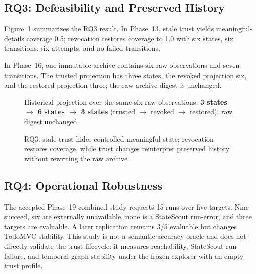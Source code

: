 \documentclass[conference]{IEEEtran}
\begin{document}
\subsection{RQ3: Defeasibility and Preserved History}
Figure~\ref{fig:defeasible} summarizes the RQ3 result. In Phase~13, stale trust yields meaningful-details coverage 0.5; revocation restores coverage to 1.0 with six states, six transitions, six attempts, and no failed transitions.

In Phase~16, one immutable archive contains six raw observations and seven transitions. The trusted projection has three states, the revoked projection six, and the restored projection three; the raw archive digest is unchanged.



\begin{figure}[t]
\centering
{}

\vspace{1mm}
{\scriptsize Historical projection over the same six raw observations: \textbf{3 states $\rightarrow$ 6 states $\rightarrow$ 3 states} (trusted $\rightarrow$ revoked $\rightarrow$ restored); raw digest unchanged.}
\caption{RQ3: stale trust hides controlled meaningful state; revocation restores coverage, while trust changes reinterpret preserved history without rewriting the raw archive.}
\label{fig:defeasible}
\end{figure}

\subsection{RQ4: Operational Robustness}
The accepted Phase~19 combined study requests 15 runs over five targets. Nine succeed, six are externally unavailable, none is a StateScout run-error, and three targets are evaluable. A later replication remains 3/5 evaluable but changes TodoMVC stability. This study is not a semantic-accuracy oracle and does not directly validate the trust lifecycle: it measures reachability, StateScout run failure, and temporal graph stability under the frozen explorer with an empty trust profile.
\end{document}
